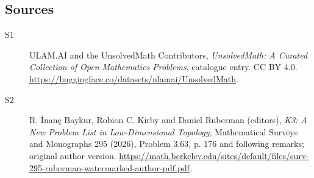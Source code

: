 \documentclass[11pt]{article}
\begin{document}
\subsection{Sources}
\begin{description}
\item[\hypertarget{source:statement:1}{S1}] ULAM.AI and the UnsolvedMath Contributors, \emph{UnsolvedMath: A Curated Collection of Open Mathematics Problems}, catalogue entry. CC BY 4.0. \url{https://huggingface.co/datasets/ulamai/UnsolvedMath}.
\item[\hypertarget{source:statement:2}{S2}] R. İnanç Baykur, Robion C. Kirby and Daniel Ruberman (editors), \emph{K3: A New Problem List in Low-Dimensional Topology}, Mathematical Surveys and Monographs 295 (2026), Problem 3.63, p. 176 and following remarks; original author version. \url{https://math.berkeley.edu/sites/default/files/surv-295-ruberman-watermarked-author-pdf.pdf}.
\end{description}
\label{end:statement}
\end{document}
